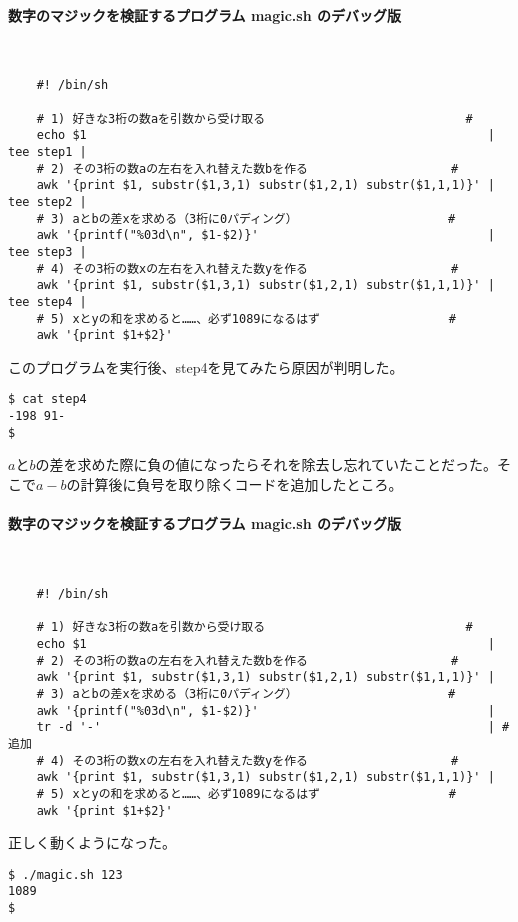 \paragraph{数字のマジックを検証するプログラム magic.sh のデバッグ版} 　\\
\begin{frameboxit}{160.0mm}
\begin{verbatim}
	#! /bin/sh
	
	# 1) 好きな3桁の数aを引数から受け取る                            #
	echo $1                                                        | tee step1 |
	# 2) その3桁の数aの左右を入れ替えた数bを作る                    #
	awk '{print $1, substr($1,3,1) substr($1,2,1) substr($1,1,1)}' | tee step2 |
	# 3) aとbの差xを求める（3桁に0パディング）                     #
	awk '{printf("%03d\n", $1-$2)}'                                | tee step3 |
	# 4) その3桁の数xの左右を入れ替えた数yを作る                    #
	awk '{print $1, substr($1,3,1) substr($1,2,1) substr($1,1,1)}' | tee step4 |
	# 5) xとyの和を求めると……、必ず1089になるはず                  #
	awk '{print $1+$2}'
\end{verbatim}
\end{frameboxit}
このプログラムを実行後、step4を見てみたら原因が判明した。
\begin{screen}
	\verb!$ cat step4! \return \\
	\verb|-198 91-| \\
	\verb|$ |
\end{screen}
$a$と$b$の差を求めた際に負の値になったらそれを除去し忘れていたことだった。そこで$a-b$の計算後に負号を取り除くコードを追加したところ。
\paragraph{数字のマジックを検証するプログラム magic.sh のデバッグ版} 　\\
\begin{frameboxit}{160.0mm}
\begin{verbatim}
	#! /bin/sh
	
	# 1) 好きな3桁の数aを引数から受け取る                            #
	echo $1                                                        |
	# 2) その3桁の数aの左右を入れ替えた数bを作る                    #
	awk '{print $1, substr($1,3,1) substr($1,2,1) substr($1,1,1)}' |
	# 3) aとbの差xを求める（3桁に0パディング）                     #
	awk '{printf("%03d\n", $1-$2)}'                                |
	tr -d '-'                                                      | # 追加
	# 4) その3桁の数xの左右を入れ替えた数yを作る                    #
	awk '{print $1, substr($1,3,1) substr($1,2,1) substr($1,1,1)}' |
	# 5) xとyの和を求めると……、必ず1089になるはず                  #
	awk '{print $1+$2}'
\end{verbatim}
\end{frameboxit}
正しく動くようになった。
\begin{screen}
	\verb!$ ./magic.sh 123! \return \\
	\verb|1089| \\
	\verb|$ |
\end{screen}

